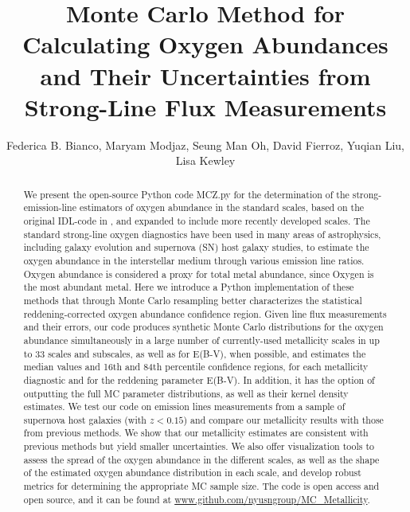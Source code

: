 \documentclass{emulateapj}
\begin{document}
\title{Monte Carlo Method for Calculating Oxygen Abundances and Their Uncertainties from Strong-Line Flux Measurements}

\author{Federica B. Bianco, Maryam Modjaz, Seung Man Oh, David Fierroz, Yuqian Liu, Lisa Kewley}
 
 
\begin{abstract}
We present the open-source Python code MCZ.py for the determination of the strong-emission-line estimators of oxygen abundance in the standard scales, based on the original IDL-code in \citet{kewley02}, and expanded to include more recently developed scales. The standard strong-line oxygen diagnostics have been used in many areas of astrophysics, including galaxy evolution and supernova (SN) host galaxy studies, to estimate the oxygen abundance in the interstellar medium through various emission line ratios. Oxygen abundance is considered a proxy for total metal abundance, since Oxygen is the most abundant metal. 
Here we introduce a Python implementation of these methods that through Monte Carlo resampling  better characterizes the statistical reddening-corrected oxygen abundance confidence region.  Given line flux measurements and their errors, our code produces synthetic Monte Carlo distributions for the oxygen abundance simultaneously in a large number of currently-used metallicity scales 
in up to 33 scales and subscales, as well as for E(B-V), when possible, and estimates the median values and 16th and 84th percentile confidence regions, for each metallicity diagnostic and for the reddening parameter E(B-V). In addition, it has the option of outputting the full MC parameter distributions, as well as their kernel density estimates. We test our code on emission lines measurements from a sample of supernova host galaxies (with $z<0.15$) and compare our metallicity results with those from previous methods. We show that our metallicity estimates are consistent with previous methods but yield smaller uncertainties. We also offer visualization tools to assess the spread of the oxygen abundance in the different scales, as well as the shape of the estimated oxygen abundance distribution in each scale, and develop robust metrics for determining the appropriate MC sample size. 
The code is open access and open source, 
and it can be found at \url{www.github.com/nyusngroup/MC_Metallicity}.
\end{abstract}
 
\end{document}
